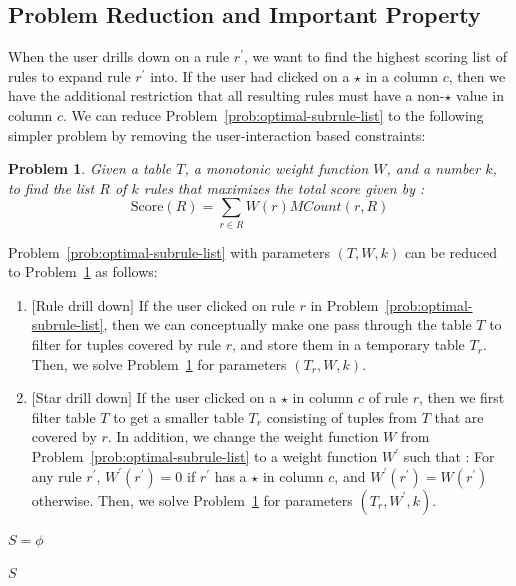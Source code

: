 \documentclass[10pt,journal,compsoc]{IEEEtran}
\newcounter{prob}
\newtheorem{problem}[prob]{Problem}
\begin{document}
\subsection{Problem Reduction and Important Property} \label{sec:reduction}
When the user drills down on a rule $r^{\prime}$, we want to find the highest scoring list of rules to expand rule $r^{\prime}$ into. If the user had clicked on a $\star$ in a column $c$, then we have the additional restriction that all resulting rules must have a non-$\star$ value in column $c$. We can reduce Problem~\ref{prob:optimal-subrule-list} to the following simpler problem by removing the user-interaction based constraints: 

\begin{problem}\label{prob:optimal-rule-list}
Given a table $T$, a monotonic weight function $W$, and a number $k$, to find the list $R$ of $k$ rules that maximizes the total score given by :
$$\text{Score}(R) = \sum_{r \in R}W(r)MCount(r,R)$$
\end{problem}

\noindent Problem~\ref{prob:optimal-subrule-list} with parameters $(T, W, k)$ can be reduced to Problem~\ref{prob:optimal-rule-list} as follows:
\begin{enumerate}
\item $[$Rule drill down$]$ If the user clicked on rule $r$ in Problem~\ref{prob:optimal-subrule-list}, then we can conceptually make one pass through the table $T$ to filter for tuples covered by rule $r$, and store them in a temporary table $T_r$. Then, we solve Problem~\ref{prob:optimal-rule-list} for parameters $(T_r, W, k)$.
\item $[$Star drill down$]$ If the user clicked on a $\star$ in column $c$ of rule $r$, then we first filter table $T$ to get a smaller table $T_r$ consisting of tuples from $T$ that are covered by $r$. In addition, we change the weight function $W$ from Problem~\ref{prob:optimal-subrule-list} to a weight function $W^{\prime}$ such that : For any rule $r^{\prime}$, $W^{\prime}(r^{\prime}) = 0$ if $r^{\prime}$ has a $\star$ in column $c$, and $W^{\prime}(r^{\prime}) = W(r^{\prime})$ otherwise. Then, we solve Problem~\ref{prob:optimal-rule-list} for parameters $(T_r, W^{\prime}, k)$.
\end{enumerate}

\begin{algorithm}
\scriptsize
{}
$S = \phi$ 

\Return $S$
\caption{Greedy Algorithm for Problem~\ref{prob:optimal-rule-set}\label{algo:best-rule-set}}
\end{algorithm}
\end{document}
